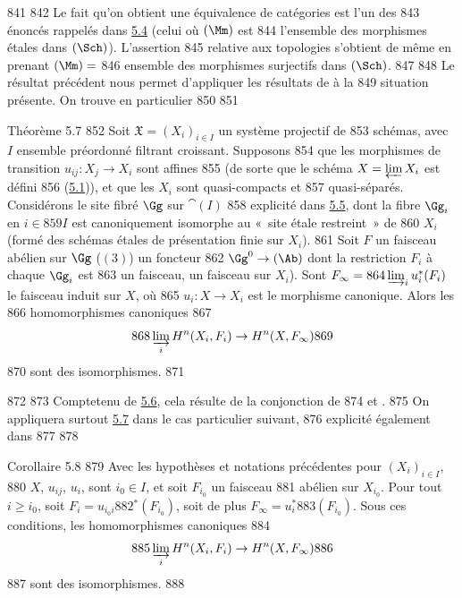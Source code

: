    841	
   842	Le fait qu'on obtient une équivalence de catégories est l'un des
   843	énoncés rappelés dans \hyperref[VII.subsec5.4]{5.4} (celui où $(\Mm)$ est
   844	l'ensemble des morphismes étales dans $(\Sch)$). L'assertion
   845	relative aux topologies s'obtient de même en prenant $(\Mm)=$
   846	ensemble des morphismes surjectifs dans $(\Sch)$.
   847	
   848	Le résultat précédent nous permet d'appliquer les résultats de à la
   849	situation présente. On trouve en particulier
   850	
   851	\begin{enonce*}{Théorème 5.7}
   852	Soit $\mathfrak{X} = (X_i)_{i \in I}$ un système projectif de
   853	schémas, avec $I$ ensemble préordonné filtrant croissant. Supposons
   854	que les morphismes de transition $u_{ij} : X_j \to X_i$ sont affines
   855	(de sorte que le schéma $X = \varprojlim X_i$ est défini
   856	(\hyperref[VII.subsec5.1]{5.1})), et que les $X_i$ sont quasi-compacts et
   857	quasi-séparés. Considérons le site fibré $\Gg$ sur $\cat(I)$
   858	explicité dans \hyperref[VII.subsec5.5]{5.5}, dont la fibre $\Gg_i$ en $i \in
   859	I$ est canoniquement isomorphe au « site étale restreint » de
   860	$X_i$ (formé des schémas étales de présentation finie sur $X_i$).
   861	Soit $F$ un faisceau abélien sur $\Gg$ (\ie $(3)$) un foncteur
   862	$\Gg^{0} \to (\Ab)$ dont la restriction $F_i$ à chaque $\Gg_i$ est
   863	un faisceau, \ie un faisceau sur $X_i$). Sont $F_{\infty} =
   864	\varinjlim_{i} u^{\ast}_i (F_i)$ le faisceau induit sur $X$, où
   865	$u_i : X \to X_i$ est le morphisme canonique. Alors les
   866	homomorphismes canoniques
   867	$$
   868	\varinjlim_i H^n (X_i, F_i) \to H^n (X, F_{\infty})
   869	$$
   870	sont des isomorphismes.
   871	\end{enonce*}
   872	
   873	Compte\pageoriginale tenu de \hyperref[VII.lem5.6]{5.6}, cela résulte de la conjonction de
   874	 et .
   875	On appliquera surtout \hyperref[VII.thm5.7]{5.7} dans le cas particulier suivant,
   876	explicité également dans
   877	
   878	\begin{enonce*}{Corollaire 5.8}
   879	Avec les hypothèses et notations précédentes pour $(X_i)_{i \in I}$,
   880	$X$, $u_{ij}$, $u_i$, sont $i_0 \in I$, et soit $F_{i_0}$ un faisceau
   881	abélien sur $X_{i_0}$. Pour tout $i \geq i_0$, soit $F_i = u_{i_0 i}
   882	{}^{\ast}(F_{i_0})$, soit de plus $F_{\infty} = u^{\ast}_i
   883	(F_{i_0})$. Sous ces conditions, les homomorphismes canoniques
   884	$$
   885	\varinjlim_i H^n (X_i, F_i) \to H^n (X, F_{\infty})
   886	$$
   887	sont des isomorphismes.
   888	\end{enonce*}
